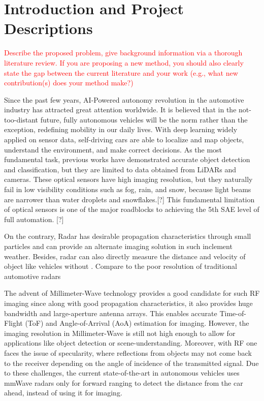 \section{Introduction and Project Descriptions}
\textcolor{red}{
Describe the proposed problem, give background information via a thorough literature review. If you are proposing a new method, you should also clearly state the gap between the current literature and your work (e.g., what new contribution(s) does your method make?)}

Since the past few years, AI-Powered autonomy revolution in the automotive industry has attracted great attention worldwide. It is believed that in the not-too-distant future, fully
autonomous vehicles will be the norm rather than the exception, redefining mobility in our daily lives. With deep learning widely applied on sensor data, self-driving cars are able to localize and map objects, understand the environment, and make correct decisions. As the most fundamental task, previous works have demonstrated accurate object detection and classification, but they are limited to data obtained from LiDARs and cameras. These optical sensors have high imaging resolution, but they naturally fail in low visibility conditions such as fog, rain, and snow, because light beams are narrower than water droplets and snowflakes.[?] This fundamental limitation of optical sensors is one of the major roadblocks to achieving the 5th SAE level of full automation. [?]  

On the contrary, Radar has desirable propagation characteristics through small particles and can provide an alternate imaging solution in such inclement weather. Besides, radar can also directly measure the distance and velocity of object like vehicles without  . Compare to the poor resolution of traditional automotive radars 

The advent of Millimeter-Wave technology provides a good candidate for such RF imaging since along with good propagation characteristics, it also provides huge bandwidth and large-aperture antenna arrays. This enables accurate Time-of-Flight (ToF) and Angle-of-Arrival (AoA) estimation for imaging. However, the imaging resolution in Millimeter-Wave is still not high enough to allow for applications like object detection or scene-understanding. Moreover, with RF one faces the issue of specularity, where reflections from objects may not come back to the receiver depending on the angle of incidence of the transmitted signal. Due to these challenges, the current state-of-the-art in autonomous vehicles uses mmWave radars only for forward ranging to detect the distance from the car ahead, instead of using it for imaging. 

